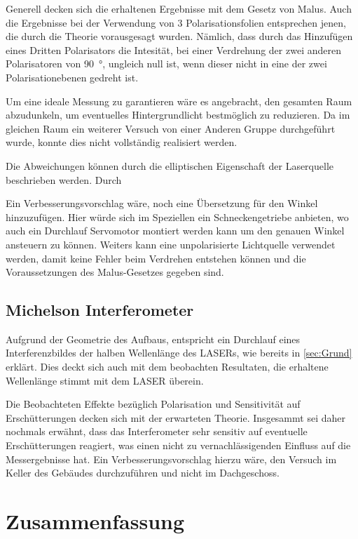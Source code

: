 \documentclass[12pt,english,ngerman]{scrartcl}
\begin{document}
Generell decken sich die erhaltenen Ergebnisse mit dem Gesetz von Malus. Auch
die Ergebnisse bei der Verwendung von 3 Polarisationsfolien entsprechen jenen,
die durch die Theorie vorausgesagt wurden. Nämlich, dass durch das Hinzufügen
eines Dritten Polarisators die Intesität, bei einer Verdrehung der zwei
anderen Polarisatoren von \SI{90}{\degree}, ungleich null ist, wenn dieser
nicht in eine der zwei Polarisationebenen gedreht ist.

Um eine ideale Messung zu garantieren wäre es angebracht, den gesamten Raum
abzudunkeln, um eventuelles Hintergrundlicht bestmöglich zu reduzieren. Da im
gleichen Raum ein weiterer Versuch von einer Anderen Gruppe durchgeführt wurde,
konnte dies nicht vollständig realisiert werden.

Die Abweichungen können durch die elliptischen Eigenschaft der Laserquelle beschrieben werden.
Durch 


Ein Verbesserungsvorschlag wäre, noch eine Übersetzung für den Winkel hinzuzufügen.
Hier würde sich im Speziellen ein Schneckengetriebe anbieten, wo auch ein Durchlauf Servomotor
montiert werden kann um den genauen Winkel ansteuern zu können.
Weiters kann eine unpolarisierte Lichtquelle verwendet werden, damit keine Fehler beim
Verdrehen entstehen können und die Voraussetzungen des Malus-Gesetzes gegeben sind.


\subsection{Michelson Interferometer}

Aufgrund der Geometrie des Aufbaus, entspricht ein Durchlauf eines
Interferenzbildes der halben Wellenlänge des LASERs, wie bereits in
\autoref{sec:Grund} erklärt. Dies deckt sich auch mit dem beobachten
Resultaten, die erhaltene Wellenlänge stimmt mit dem LASER überein.

Die Beobachteten Effekte bezüglich Polarisation und Sensitivität auf
Erschütterungen decken sich mit der erwarteten Theorie. Insgesammt sei daher
nochmals erwähnt, dass das Interferometer sehr sensitiv auf eventuelle
Erschütterungen reagiert, was einen nicht zu vernachlässigenden Einfluss auf
die Messergebnisse hat. Ein Verbesserungsvorschlag hierzu wäre, den Versuch im
Keller des Gebäudes durchzuführen und nicht im Dachgeschoss.

\newpage

\section{Zusammenfassung}\label{sec:zusammenfassung}
\end{document}
